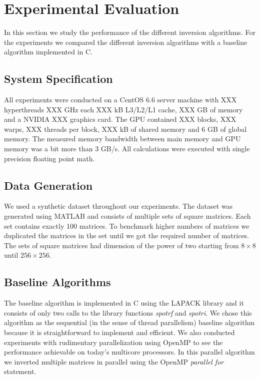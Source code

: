 \documentclass[11pt]{article}
\begin{document}
\section{Experimental Evaluation}

In this section we study the performance of the different inversion algorithms. For the experiments we compared the different inversion algorithms with a baseline algorithm implemented in C.

\subsection{System Specification}

All experiments were conducted on a CentOS 6.6 server machine with XXX hyperthreads XXX GHz each XXX kB L3/L2/L1 cache, XXX GB of memory and a NVIDIA XXX graphics card. The GPU contained XXX blocks, XXX warps, XXX threads per block, XXX kB of shared memory and 6 GB of global memory. The measured memory bandwidth between main memory and GPU memory was a bit more than 3 GB/s. All calculations were executed with single precision floating point math.

\subsection{Data Generation}

We used a synthetic dataset throughout our experiments. The dataset was generated using MATLAB and consists of multiple sets of square matrices. Each set contains exactly 100 matrices. To benchmark higher numbers of matrices we duplicated the matrices in the set until we got the required number of matrices. The sets of square matrices had dimension of the power of two starting from $8 \times 8$ until $256 \times 256$.

\subsection{Baseline Algorithms}

The baseline algorithm is implemented in C using the LAPACK library and it consists of only two calls to the library functions {\it spotrf} and {\it spotri}. We chose this algorithm as the sequential (in the sense of thread parallelism) baseline algorithm because it is straightforward to implement and efficient. We also conducted experiments with rudimentary parallelization using OpenMP to see the performance achievable on today's multicore processors. In this parallel algorithm we inverted multiple matrices in parallel using the OpenMP \textit{parallel for} statement.
\end{document}
